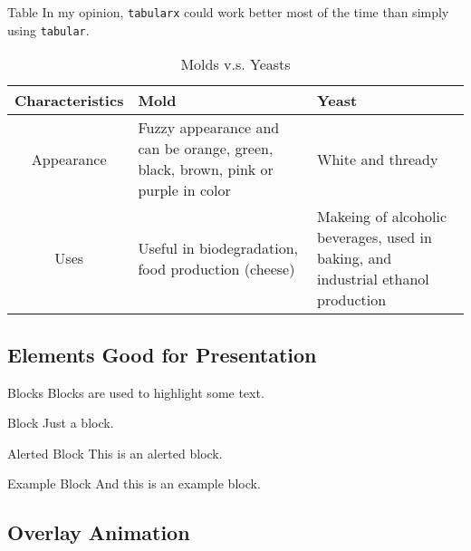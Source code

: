 \documentclass[10pt]{beamer}
\begin{document}

\begin{frame}{Table}
  In my opinion, \texttt{tabularx} could work better most of the time than simply using \texttt{tabular}.
  \begin{table}
    \centering
    \begin{tabularx}{\textwidth}{|c|X|X|}
      \hline
      \textbf{Characteristics} & \textbf{Mold} & \textbf{Yeast} \\ \hline\hline
      Appearance
      & Fuzzy appearance and can be orange, green, black, brown, pink or purple in color
      & White and thready \\ \hline
      Uses
      & Useful in biodegradation, food production (cheese)
      & Makeing of alcoholic beverages, used in baking, and industrial ethanol production \\ \hline
    \end{tabularx}
    \caption{Molds v.s. Yeasts}
    \label{tab:molds-vs-yeasts}
  \end{table}
\end{frame}

\subsection{Elements Good for Presentation}

\begin{frame}{Blocks}
  Blocks are used to highlight some text.
  \begin{block}{Block}
    Just a block.
  \end{block}
  \begin{alertblock}{Alerted Block}
    This is an alerted block.
  \end{alertblock}
  \begin{exampleblock}{Example Block}
    And this is an example block.
  \end{exampleblock}
\end{frame}

\subsection{Overlay Animation}
\end{document}
